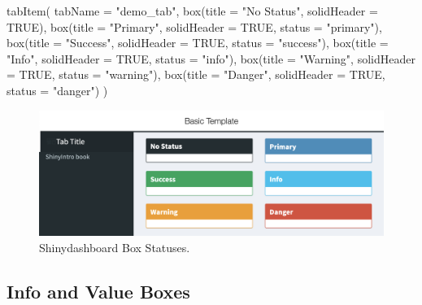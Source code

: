 \documentclass[
  oneside]{book}
\newenvironment{Shaded}{\begin{snugshade}}{\end{snugshade}}
\newcommand{\AttributeTok}[1]{\textcolor[rgb]{0.77,0.63,0.00}{#1}}
\newcommand{\ConstantTok}[1]{\textcolor[rgb]{0.00,0.00,0.00}{#1}}
\newcommand{\FunctionTok}[1]{\textcolor[rgb]{0.00,0.00,0.00}{#1}}
\newcommand{\NormalTok}[1]{#1}
\newcommand{\StringTok}[1]{\textcolor[rgb]{0.31,0.60,0.02}{#1}}
\begin{document}
\begin{Shaded}
\begin{Highlighting}[]
\FunctionTok{tabItem}\NormalTok{(}
    \AttributeTok{tabName =} \StringTok{"demo\_tab"}\NormalTok{,}
    \FunctionTok{box}\NormalTok{(}\AttributeTok{title =} \StringTok{"No Status"}\NormalTok{, }\AttributeTok{solidHeader =} \ConstantTok{TRUE}\NormalTok{),}
    \FunctionTok{box}\NormalTok{(}\AttributeTok{title =} \StringTok{"Primary"}\NormalTok{,   }\AttributeTok{solidHeader =} \ConstantTok{TRUE}\NormalTok{, }\AttributeTok{status =} \StringTok{"primary"}\NormalTok{),}
    \FunctionTok{box}\NormalTok{(}\AttributeTok{title =} \StringTok{"Success"}\NormalTok{,   }\AttributeTok{solidHeader =} \ConstantTok{TRUE}\NormalTok{, }\AttributeTok{status =} \StringTok{"success"}\NormalTok{),}
    \FunctionTok{box}\NormalTok{(}\AttributeTok{title =} \StringTok{"Info"}\NormalTok{,      }\AttributeTok{solidHeader =} \ConstantTok{TRUE}\NormalTok{, }\AttributeTok{status =} \StringTok{"info"}\NormalTok{),}
    \FunctionTok{box}\NormalTok{(}\AttributeTok{title =} \StringTok{"Warning"}\NormalTok{,   }\AttributeTok{solidHeader =} \ConstantTok{TRUE}\NormalTok{, }\AttributeTok{status =} \StringTok{"warning"}\NormalTok{),}
    \FunctionTok{box}\NormalTok{(}\AttributeTok{title =} \StringTok{"Danger"}\NormalTok{,    }\AttributeTok{solidHeader =} \ConstantTok{TRUE}\NormalTok{, }\AttributeTok{status =} \StringTok{"danger"}\NormalTok{)}
\NormalTok{)}
\end{Highlighting}
\end{Shaded}

\begin{figure}

{\centering \includegraphics[width=1\linewidth]{images/sdb_box_status} 

}

\caption{Shinydashboard Box Statuses.}\label{fig:sdb-box-status}
\end{figure}

\hypertarget{info-and-value-boxes}{%
\subsection{Info and Value Boxes}\label{info-and-value-boxes}}
\end{document}

